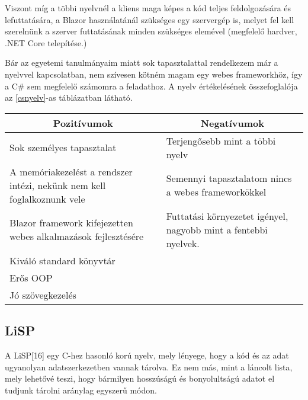 Viszont míg a többi nyelvnél a kliens maga képes a kód teljes feldolgozására és lefuttatására, a Blazor használatánál szükséges egy szervergép is, melyet fel kell szerelnünk a szerver futtatásának minden szükséges elemével (megfelelő hardver, .NET Core telepítése.)

Bár az egyetemi tanulmányaim miatt sok tapasztalattal rendelkezem már a nyelvvel kapcsolatban, nem szívesen kötném magam egy webes frameworkhöz, így a C\# sem megfelelő számomra a feladathoz. A nyelv értékelésének összefoglalója az \ref{csnyelv}-as táblázatban látható.

\begin{center}
  \begin{tabularx}{\textwidth}{X X}
    \hline
    \multicolumn{1}{c}{\bfseries{Pozitívumok}}                              & \multicolumn{1}{c}{\bfseries{Negatívumok}}                      \\
    \hline
    Sok személyes tapasztalat                                               & Terjengősebb mint a többi nyelv                                 \\
    A memóriakezelést a rendszer intézi, nekünk nem kell foglalkoznunk vele & Semennyi tapasztalatom nincs a webes frameworkökkel             \\
    Blazor framework kifejezetten webes alkalmazások fejlesztésére          & Futtatási környezetet igényel, nagyobb mint a fentebbi nyelvek. \\
    Kiváló standard könyvtár                                                                                                                  \\
    Erős OOP                                                                                                                                  \\
    Jó szövegkezelés                                                                                                                          \\
    \hline
  \end{tabularx}
\end{center}

\newpage

\subsection{LiSP}

A LiSP[16] egy C-hez hasonló korú nyelv, mely lényege, hogy a kód és az adat ugyanolyan adatszerkezetben vannak tárolva. Ez nem más, mint a láncolt lista, mely lehetővé teszi, hogy bármilyen hosszúságú és bonyolultságú adatot el tudjunk tárolni aránylag egyszerű módon.

